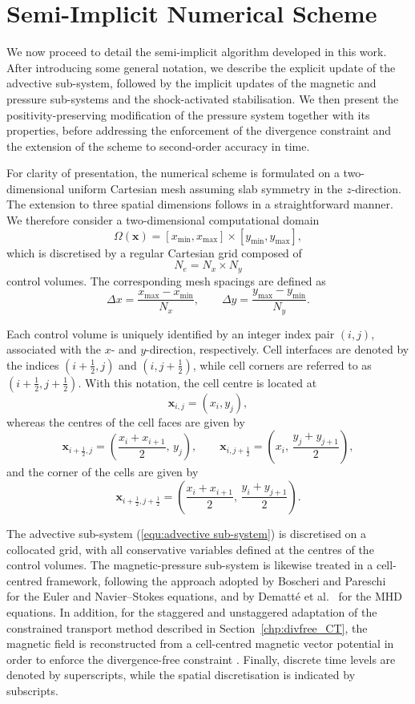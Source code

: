 \documentclass[a4paper,fleqn]{cas-sc}
\theoremstyle{definition}
\theoremstyle{remark}
\begin{document}
\section{Semi-Implicit Numerical Scheme}
\label{sec:scheme}

We now proceed to detail the semi-implicit algorithm developed in this work. After
introducing some general notation, we describe the explicit update of the advective
sub-system, followed by the implicit updates of the magnetic and pressure sub-systems
and the shock-activated stabilisation. We then present the positivity-preserving
modification of the pressure system together with its properties, before addressing
the enforcement of the divergence constraint and the extension of the scheme to
second-order accuracy in time.

For clarity of presentation, the numerical scheme is formulated on a two-dimensional
uniform Cartesian mesh assuming slab symmetry in the $z$-direction. The extension to
three spatial dimensions follows in a straightforward manner. We therefore consider
a two-dimensional computational domain
\[
\Omega(\mathbf{x}) = [x_{\min}, x_{\max}] \times [y_{\min}, y_{\max}],
\]
which is discretised by a regular Cartesian grid composed of
\[
N_e = N_x \times N_y
\]
control volumes. The corresponding mesh spacings are defined as
\[
\Delta x = \frac{x_{\max} - x_{\min}}{N_x}, \qquad
\Delta y = \frac{y_{\max} - y_{\min}}{N_y}.
\]

Each control volume is uniquely identified by an integer index pair $(i,j)$, associated
with the $x$- and $y$-direction, respectively. Cell interfaces are denoted by the indices
$(i+\tfrac{1}{2},j)$ and $(i,j+\tfrac{1}{2})$, while cell corners are referred to as
$(i+\tfrac{1}{2},j+\tfrac{1}{2})$. With this notation, the cell centre is located at
\[
\mathbf{x}_{i,j} = (x_i, y_j),
\]
whereas the centres of the cell faces are given by
\[
\mathbf{x}_{i+\frac{1}{2},j}
=
\left(
\frac{x_i + x_{i+1}}{2},\, y_j
\right),
\qquad
\mathbf{x}_{i,j+\frac{1}{2}}
=
\left(
x_i,\, \frac{y_j + y_{j+1}}{2}
\right),
\]
and the corner of the cells are given by
\[
\mathbf{x}_{i+\frac{1}{2},j + \frac{1}{2}}
=
\left(
\frac{x_i + x_{i+1}}{2},\, \frac{y_i + y_{j+1}}{2}
\right).
\]

The advective sub-system (\ref{equ:advective sub-system}) is discretised on a collocated grid, with all conservative variables defined at the centres of the control volumes. The magnetic-pressure sub-system is likewise treated in a cell-centred framework, following the approach adopted by Boscheri and Pareschi ~\cite{BoscheriPareschi2021} for the Euler and Navier--Stokes equations, and by Dematt\'e et al.~\cite{Dematte2024} for the MHD
equations. In addition, for the staggered and unstaggered adaptation of the constrained transport method 
described in Section~\ref{chp:divfree_CT}, the magnetic field is reconstructed 
from a cell-centred magnetic vector potential in order to enforce the 
divergence-free constraint \cite{Dematte2024}. Finally, discrete time levels are denoted by 
superscripts, while the spatial discretisation is indicated by subscripts.
\end{document}
